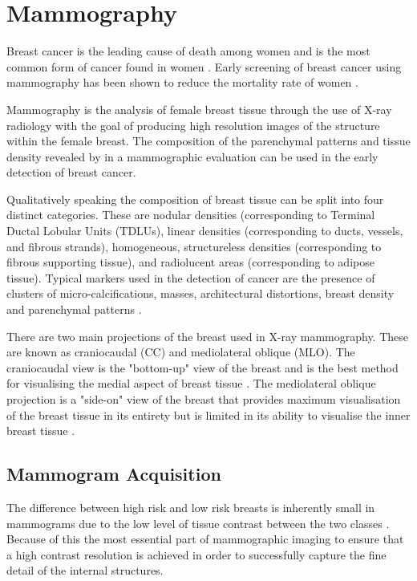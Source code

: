 \section{Mammography}

Breast cancer is the leading cause of death among women and is the most common form of cancer found in women \cite{siegel2014cancer}. Early screening of breast cancer using mammography has been shown to reduce the mortality rate of women \cite{independent2012benefits, smith2014cancer}.

Mammography is the analysis of female breast tissue through the use of X-ray radiology with the goal of producing high resolution images of the structure within the female breast. The composition of the parenchymal patterns and tissue density revealed by in a mammographic evaluation can be used in the early detection of breast cancer.

Qualitatively speaking the composition of breast tissue can be split into four distinct categories. These are nodular densities (corresponding to Terminal Ductal Lobular Units (TDLUs), linear densities (corresponding to ducts, vessels, and fibrous strands), homogeneous, structureless densities (corresponding to fibrous supporting tissue), and radiolucent areas (corresponding to adipose tissue)\cite{tabar2005breast}. Typical markers used in the detection of cancer are the presence of clusters of micro-calcifications, masses, architectural distortions, breast density and parenchymal patterns \cite{sampat2005computer}.

There are two main projections of the breast used in X-ray mammography. These are known as craniocaudal (CC) and mediolateral oblique (MLO). The craniocaudal view is the "bottom-up" view of the breast and is the best method for visualising the medial aspect of breast tissue \cite{fischer2008breast}. The mediolateral oblique projection is a "side-on" view of the breast that provides maximum visualisation of the breast tissue in its entirety but is limited in its ability to visualise the inner breast tissue \cite{fischer2008breast}.

\subsection{Mammogram Acquisition}
The difference between high risk and low risk breasts is inherently small in mammograms due to the low level of tissue contrast between the two classes \cite{kopans1998breast}. Because of this the most essential part of mammographic imaging to ensure that a high contrast resolution is achieved in order to successfully capture the fine detail of the internal structures.

